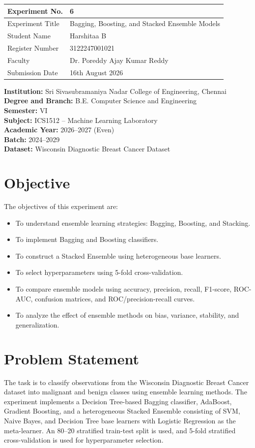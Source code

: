 \documentclass[12pt,a4paper]{article}
\begin{document}
\begin{tabular}{|p{4cm}|p{11cm}|}
\hline
Experiment No. & 6 \\ \hline
Experiment Title & Bagging, Boosting, and Stacked Ensemble Models \\ \hline
Student Name & Harshitaa B\\ \hline
Register Number & 3122247001021\\ \hline
Faculty & Dr. Poreddy Ajay Kumar Reddy \\ \hline
Submission Date & 16th August 2026\\ \hline
\end{tabular}

\vspace{0.5cm}
\noindent\textbf{Institution:} Sri Sivasubramaniya Nadar College of Engineering, Chennai\\
\textbf{Degree and Branch:} B.E. Computer Science and Engineering\\
\textbf{Semester:} VI\\
\textbf{Subject:} ICS1512 -- Machine Learning Laboratory\\
\textbf{Academic Year:} 2026--2027 (Even)\\
\textbf{Batch:} 2024--2029\\
\textbf{Dataset:} Wisconsin Diagnostic Breast Cancer Dataset

\section{Objective}
The objectives of this experiment are:
\begin{itemize}
\item To understand ensemble learning strategies: Bagging, Boosting, and Stacking.
\item To implement Bagging and Boosting classifiers.
\item To construct a Stacked Ensemble using heterogeneous base learners.
\item To select hyperparameters using 5-fold cross-validation.
\item To compare ensemble models using accuracy, precision, recall, F1-score, ROC-AUC, confusion matrices, and ROC/precision-recall curves.
\item To analyze the effect of ensemble methods on bias, variance, stability, and generalization.
\end{itemize}

\section{Problem Statement}
The task is to classify observations from the Wisconsin Diagnostic Breast Cancer dataset into malignant and benign classes using ensemble learning methods. The experiment implements a Decision Tree-based Bagging classifier, AdaBoost, Gradient Boosting, and a heterogeneous Stacked Ensemble consisting of SVM, Naive Bayes, and Decision Tree base learners with Logistic Regression as the meta-learner. An 80--20 stratified train-test split is used, and 5-fold stratified cross-validation is used for hyperparameter selection.
\end{document}
